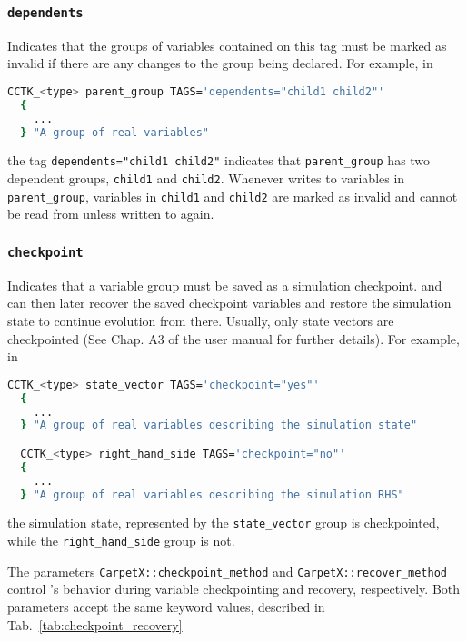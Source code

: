 \subsubsection{\texttt{dependents}}

Indicates that the groups of variables contained on this tag must be marked as invalid if there are any changes to the group being declared. For example, in
%
\begin{lstlisting}[language=bash]
  CCTK_<type> parent_group TAGS='dependents="child1 child2"'
  {
    ...
  } "A group of real variables"
\end{lstlisting}
%
the tag \texttt{dependents="child1 child2"} indicates that \texttt{parent\_group} has two dependent groups, \texttt{child1} and \texttt{child2}. Whenever \CarpetX\space writes to variables in \texttt{parent\_group}, variables in \texttt{child1} and \texttt{child2} are marked as invalid and cannot be read from unless written to again.

\subsubsection{\texttt{checkpoint}}

Indicates that a variable group must be saved as a simulation checkpoint. \Cactus\space and \CarpetX\space can then later recover the saved checkpoint variables and restore the simulation state to continue evolution from there. Usually, only state vectors are checkpointed (See Chap. A3 of the \Cactus user manual for further details). For example, in
%
\begin{lstlisting}[language=bash]
  CCTK_<type> state_vector TAGS='checkpoint="yes"'
  {
    ...
  } "A group of real variables describing the simulation state"

  CCTK_<type> right_hand_side TAGS='checkpoint="no"'
  {
    ...
  } "A group of real variables describing the simulation RHS"
\end{lstlisting}
%
the simulation state, represented by the \texttt{state\_vector} group is checkpointed, while the \texttt{right\_hand\_side} group is not.

The parameters \texttt{CarpetX::checkpoint\_method} and \texttt{CarpetX::recover\_method} control \CarpetX's behavior during variable checkpointing and recovery, respectively. Both parameters accept the same keyword values, described in Tab.~\ref{tab:checkpoint_recovery}

